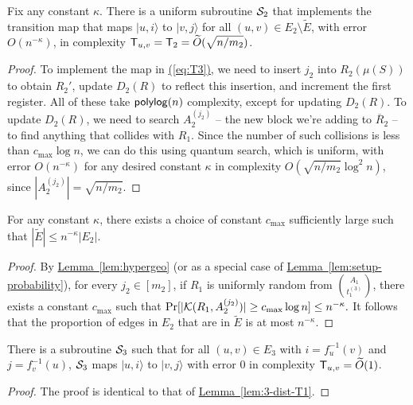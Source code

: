 \documentclass{theoretics}
\newcommand{\eq}[1]{\hyperref[eq:#1]{(\ref*{eq:#1})}}
\newcommand{\lem}[1]{\hyperref[lem:#1]{Lemma~\ref*{lem:#1}}}
\def\ket#1{{\lvert}#1\rangle}
\renewcommand{\>}{\rangle}
\newcommand{\<}{\langle}
\renewcommand{\(}{\left(}
\renewcommand{\)}{\right)}
\begin{document}
\begin{lemma}\label{lem:3-dist-T3}
Fix any constant $\kappa$. There is a uniform subroutine ${\cal S}_2$ that implements the transition map that maps $\ket{u,i}$ to $\ket{v,j}$ for all $(u,v)\in E_2\setminus\tilde{E}$, with error $O(n^{-\kappa})$, in complexity ${\sf T}_{u,v}={\sf T}_2=\widetilde{O}(\sqrt{n/m_2})$. 
\end{lemma}
\begin{proof}
To implement the map in \eq{T3}, we need to insert $j_2$ into $R_2(\mu(S))$ to obtain $R_2'$, update $D_2(R)$ to reflect this insertion, and increment the first register. All of these take ${\sf polylog}(n)$ complexity, except for updating $D_2(R)$. To update $D_2(R)$, we need to search $A_2^{(j_2)}$ -- the new block we're adding to $\overline{R}_2$ -- to find anything that collides with $R_1$. Since the number of such collisions is less than $c_{\max}\log n$, we can do this using quantum search, which is uniform, with error $O(n^{-\kappa})$ for any desired constant $\kappa$ in complexity 
$O(\sqrt{n/m_2}\log^2 n)$, since $|A_2^{(j_2)}|=\sqrt{n/m_2}$.
\end{proof}



\begin{lemma}\label{lem:tilde-E}
For any constant $\kappa$, there exists a choice of constant $c_{\max}$ sufficiently large such that 
$|\tilde{E}|\leq n^{-\kappa}|E_2|$. 
\end{lemma}
\begin{proof}
By \lem{hypergeo} (or as a special case of \lem{setup-probability}), for every $j_2\in [m_2]$, if $R_1$ is uniformly random from $\binom{A_1}{t_1^{(3)}}$, there exists a constant $c_{\max}$ such that 
$\Pr[|{\cal K}({R}_1,A_2^{(j_2)})|\geq c_{\max}\log n]\leq n^{-\kappa}.$
It follows that the proportion of edges in $E_2$ that are in $\tilde{E}$ is at most $n^{-\kappa}$.
\end{proof}
\begin{lemma}\label{lem:3-dist-T4}
There is a subroutine ${\cal S}_3$ such that for all $(u,v)\in E_3$ with $i=f_u^{-1}(v)$ and $j=f_v^{-1}(u)$, ${\cal S}_3$ maps $\ket{u,i}$ to $\ket{v,j}$ with error 0 in complexity ${\sf T}_{u,v}=\widetilde{O}(1)$.
\end{lemma}
\begin{proof}
The proof is identical to that of \lem{3-dist-T1}.
\end{proof}
\end{document}
